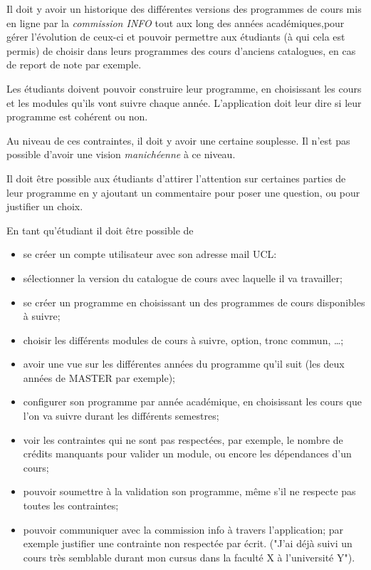 Il doit y avoir un historique des différentes versions des programmes de cours mis en ligne par la \textit{commission INFO} tout aux long des années académiques,pour gérer l'évolution de ceux-ci et pouvoir permettre aux étudiants (à qui cela est permis) de choisir dans leurs programmes des cours d'anciens catalogues, en cas de report de note par exemple.
 
Les étudiants doivent pouvoir construire leur programme, en choisissant les cours et les modules qu'ils vont suivre chaque année. L'application doit leur dire si leur programme est cohérent ou non.

Au niveau de ces contraintes, il doit y avoir une certaine souplesse. Il n'est pas possible d'avoir une vision \textit{manichéenne} à ce niveau.

Il doit être possible aux étudiants d'attirer l'attention sur certaines parties de leur programme en y ajoutant un commentaire pour poser une question, ou pour justifier un choix.

En tant qu'étudiant il doit être possible de
\begin{itemize}
\item se créer un compte utilisateur avec son adresse mail UCL:
\item sélectionner la version du catalogue de cours avec laquelle il va travailler;
\item se créer un programme en choisissant un des programmes de cours disponibles à suivre;
\item choisir les différents modules de cours à suivre, option, tronc commun, \ldots ;
\item avoir une vue sur les différentes années du programme qu'il suit (les deux années de MASTER par exemple);
\item configurer son programme par année académique, en choisissant les cours que l'on va suivre durant les différents semestres;
\item voir les contraintes qui ne sont pas respectées, par exemple, le nombre de crédits manquants pour valider un module, ou encore les dépendances d'un cours;
\item pouvoir soumettre à la validation son programme, même s'il ne respecte pas toutes les contraintes;
\item pouvoir communiquer avec la commission info à travers l'application; par exemple justifier une contrainte non respectée par écrit. ("J'ai déjà suivi un cours très semblable durant mon cursus dans la faculté X à l'université Y").  
\end{itemize}


